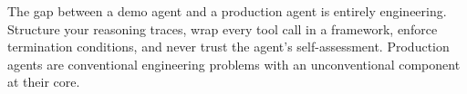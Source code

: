 \begin{keytakeaway}
The gap between a demo agent and a production agent is entirely engineering. Structure your reasoning traces, wrap every tool call in a framework, enforce termination conditions, and never trust the agent's self-assessment. Production agents are conventional engineering problems with an unconventional component at their core.
\end{keytakeaway}
